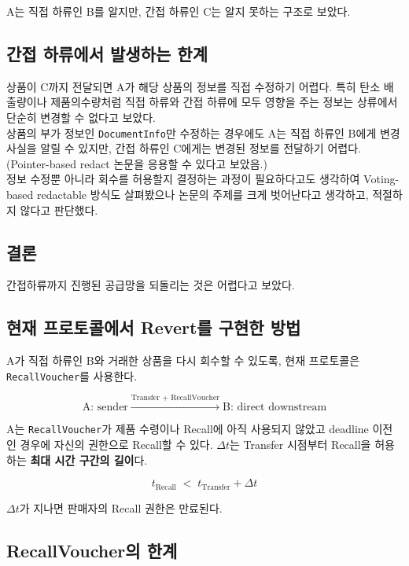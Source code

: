 \documentclass[11pt,a4paper]{extarticle}
\begin{document}
A는 직접 하류인 B를 알지만, 간접 하류인 C는 알지 못하는 구조로 보았다.

\subsection{간접 하류에서 발생하는 한계}

상품이 C까지 전달되면 A가 해당 상품의 정보를 직접 수정하기 어렵다. 특히 탄소
배출량이나 제품의수량처럼 직접 하류와 간접 하류에 모두 영향을 주는 정보는 상류에서
단순히 변경할 수 없다고 보았다.\\

상품의 부가 정보인 \texttt{DocumentInfo}만 수정하는 경우에도 A는 직접 하류인
B에게 변경 사실을 알릴 수 있지만, 간접 하류인 C에게는 변경된 정보를 전달하기
어렵다. (Pointer-based redact 논문을 응용할 수 있다고 보았음.)\\

정보 수정뿐 아니라 회수를 허용할지 결정하는 과정이 필요하다고도 생각하여 Voting-based redactable 방식도 살펴봤으나
논문의 주제를 크게 벗어난다고 생각하고, 적절하지 않다고 판단했다.

\subsection{결론}

간접하류까지 진행된 공급망을 되돌리는 것은 어렵다고 보았다.


\subsection{현재 프로토콜에서 Revert를 구현한 방법}

A가 직접 하류인 B와 거래한 상품을 다시 회수할 수 있도록, 현재 프로토콜은
\texttt{RecallVoucher}를 사용한다.

\[
  \boxed{\text{A: sender}}
  \;\xrightarrow{\text{Transfer + RecallVoucher}}\;
  \boxed{\text{B: direct downstream}}
\]

A는 \texttt{RecallVoucher}가 제품 수령이나 Recall에 아직 사용되지 않았고
deadline 이전인 경우에 자신의 권한으로 Recall할 수 있다. \(\Delta t\)는
Transfer 시점부터 Recall을 허용하는 \textbf{최대 시간 구간의 길이}다.

\[
  t_{\mathrm{Recall}}
  \;<\;
  t_{\mathrm{Transfer}}+\Delta t
\]

\(\Delta t\)가 지나면 판매자의 Recall 권한은 만료된다.

\subsection{RecallVoucher의 한계}
\end{document}
